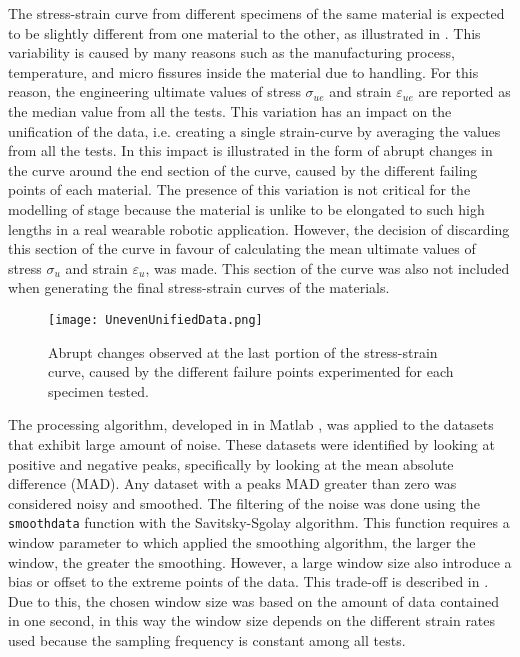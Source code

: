 The stress-strain curve from different specimens of the same material is expected to be slightly different from one material to the other, as illustrated in . This variability is caused by many reasons such as the manufacturing process, temperature, and micro fissures inside the material due to handling. For this reason, the engineering ultimate values of stress $\sigma_{ue}$ and strain $\varepsilon_{ue}$ are reported as the median value from all the tests. This variation has an impact on the unification of the data, i.e. creating a single strain-curve by averaging the values from all the tests. In  this impact is illustrated in the form of abrupt changes in the curve around the end section of the curve, caused by the different failing points of each material. The presence of this variation is not critical for the modelling of stage because the material is unlike to be elongated to such high lengths in a real wearable robotic application. However, the decision of discarding this section of the curve in favour of calculating the mean ultimate values of stress $\sigma_u$ and strain $\varepsilon_u$, was made. This section of the curve was also not included when generating the final stress-strain curves of the materials.

\begin{figure}[htb!]
    \centering
    \texttt{[image: UnevenUnifiedData.png]}
    \caption{Abrupt changes observed at the last portion of the stress-strain curve, caused by the different failure points experimented for each specimen tested.}
    \label{fig:unevenData}
\end{figure}

The processing algorithm, developed in in Matlab \textregistered{}, was applied to the datasets that exhibit large amount of noise. These datasets were identified by looking at positive and negative peaks, specifically by looking at the mean absolute difference (MAD). Any dataset with a peaks MAD greater than zero was considered noisy and smoothed. The filtering of the noise was done using the \texttt{smoothdata} function with the Savitsky-Sgolay algorithm. This function requires a window parameter to which applied the smoothing algorithm, the larger the window, the greater the smoothing. However, a large window size also introduce a bias or offset to the extreme points of the data. This trade-off is described in \cite{sadeghi2018optimum}. Due to this, the chosen window size was based on the amount of data contained in one second, in this way the window size depends on the different strain rates used because the sampling frequency is constant among all tests. 

